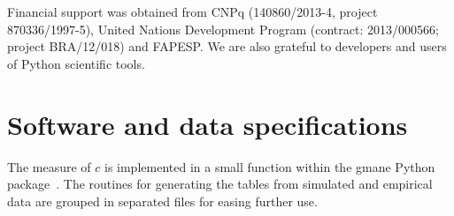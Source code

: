 \documentclass[%
	aip,
	jmp,%
	amsmath,amssymb,
	reprint,%
]{revtex4-1}
\begin{document}
\begin{acknowledgments}
	Financial support was obtained from CNPq (140860/2013-4,
	project 870336/1997-5), United Nations Development Program (contract: 2013/000566; project BRA/12/018) and FAPESP. 
	We are also grateful to developers and users of Python scientific tools.
\end{acknowledgments}


\appendix
\section{Software and data specifications}\label{ap:soft}
The measure of $c$ is implemented in a small function within
the gmane Python package~\cite{gmanePack}.
The routines for generating the tables from simulated and empirical
data are grouped in separated files for easing further use.


\end{document}
